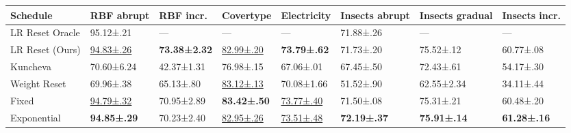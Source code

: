 \begin{tabular}{llllllll}
    \toprule
    Schedule        & RBF abrupt            & RBF incr.            & Covertype             & Electricity           & Insects abrupt      & Insects gradual     & Insects incr.       \\
    \midrule
    LR Reset Oracle & 95.12±.21             & ---                  & ---                   & ---                   & 71.88±.26           & ---                 & ---                 \\
    LR Reset (Ours) & \underline{94.83±.26} & \bfseries 73.38±2.32 & \underline{82.99±.20} & \bfseries 73.79±.62   & 71.73±.20           & 75.52±.12           & 60.77±.08           \\
    Kuncheva        & 70.60±6.24            & 42.37±1.31           & 76.98±.15             & 67.06±.01             & 67.45±.50           & 72.43±.61           & 54.17±.30           \\
    Weight Reset    & 69.96±.38             & 65.13±.80            & \underline{83.12±.13} & 70.08±1.66            & 51.52±.90           & 62.55±2.34          & 34.11±.44           \\
    Fixed           & \underline{94.79±.32} & 70.95±2.89           & \bfseries 83.42±.50   & \underline{73.77±.40} & 71.50±.08           & 75.31±.21           & 60.48±.20           \\
    Exponential     & \bfseries 94.85±.29   & 70.23±2.40           & \underline{82.95±.26} & \underline{73.51±.48} & \bfseries 72.19±.37 & \bfseries 75.91±.14 & \bfseries 61.28±.16 \\
    \bottomrule
\end{tabular}

